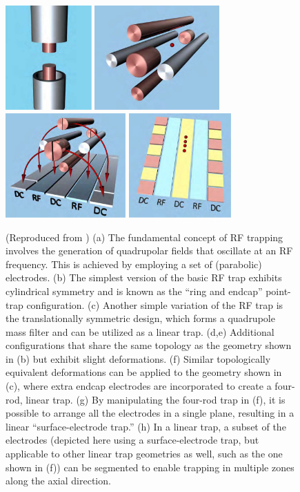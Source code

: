 \documentclass[
  journal=largetwo,
  year=2023,
]{cup-journal}
\begin{document}
\begin{figure}
  \includegraphics[height=4cm]{figs/fig1/p5_7.png}
  \includegraphics[height=4cm]{figs/fig1/p5_1.png}
  \includegraphics[height=4cm]{figs/fig1/p5_2.png}
  \includegraphics[height=4cm]{figs/fig1/p5_3.png}

  \caption{(Reproduced from \autocite{brownnutt_2015_iontrap}) (a) The fundamental concept of RF trapping involves the generation of quadrupolar fields that oscillate at an RF frequency. This is achieved by employing a set of (parabolic) electrodes. (b) The simplest version of the basic RF trap exhibits cylindrical symmetry and is known as the ``ring and endcap'' point-trap configuration. (c) Another simple variation of the RF trap is the translationally symmetric design, which forms a quadrupole mass filter and can be utilized as a linear trap. (d,e) Additional configurations that share the same topology as the geometry shown in (b) but exhibit slight deformations. (f) Similar topologically equivalent deformations can be applied to the geometry shown in (c), where extra endcap electrodes are incorporated to create a four-rod, linear trap. (g) By manipulating the four-rod trap in (f), it is possible to arrange all the electrodes in a single plane, resulting in a linear ``surface-electrode trap.'' (h) In a linear trap, a subset of the electrodes (depicted here using a surface-electrode trap, but applicable to other linear trap geometries as well, such as the one shown in (f)) can be segmented to enable trapping in multiple zones along the axial direction.}\label{fig:traps}
\end{figure}
\end{document}

